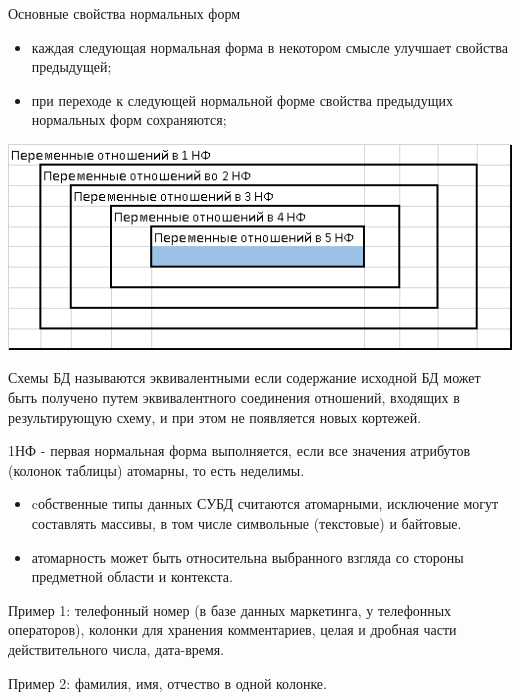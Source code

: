 \documentclass{beamer}
\begin{document}
\begin{frame}
\begin{block}{Основные свойства нормальных форм}
\begin{itemize}
\item каждая следующая нормальная форма в некотором смысле улучшает свойства предыдущей;
\item при переходе к следующей нормальной форме свойства предыдущих нормальных форм сохраняются;
\end{itemize}
\end{block}
\begin{center}
\includegraphics[scale=0.5]{images/forms.png}
\end{center}
\begin{block}{Схемы БД называются эквивалентными}
если содержание исходной БД может быть получено путем эквивалентного соединения отношений, входящих в результирующую схему, и при этом не появляется новых кортежей.
\end{block}
\end{frame} 

\begin{frame}
\begin{block}{1НФ - первая нормальная форма}
выполняется, если все значения атрибутов (колонок таблицы) атомарны, то есть неделимы.
\end{block}
\begin{itemize}
\item cобственные типы данных СУБД считаются атомарными, исключение
могут составлять массивы, в том числе символьные (текстовые) и байтовые.
\item атомарность может быть относительна выбранного взгляда со стороны предметной области и контекста. \end{itemize}
Пример 1: телефонный номер (в базе данных маркетинга, у телефонных операторов), колонки для хранения комментариев, целая и дробная части действительного числа, дата-время.

Пример 2: фамилия, имя, отчество в одной колонке.
\end{frame} 
\end{document}
